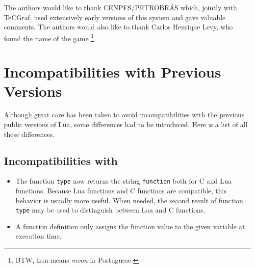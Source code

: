 The authors would like to thank CENPES/PETROBR\'AS which,
jointly with TeCGraf, used extensively early versions of
this system and gave valuable comments.
The authors would also like to thank Carlos Henrique Levy,
who found the name of the game%
\footnote{BTW, Lua means {\em moon} in Portuguese.}.



\appendix

\section{Incompatibilities with Previous Versions}

Although great care has been taken to avoid incompatibilities with
the previous public versions of Lua,
some differences had to be introduced.
Here is a list of all these differences.

\subsection*{Incompatibilities with }
\begin{itemize}
\item
The function {\tt type} now returns the string {\tt function}
both for C and Lua functions.
Because Lua functions and C functions are compatible,
this behavior is usually more useful.
When needed, the second result of function {\tt type} may be used
to distinguish between Lua and C functions.
\item
A function definition only assigns the function value to the
given variable at execution time.
\end{itemize}

